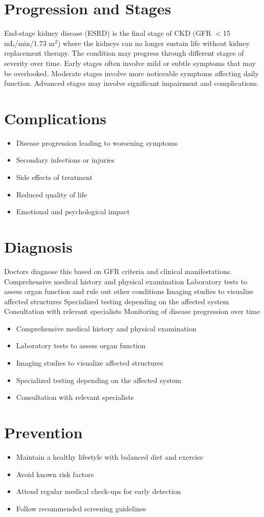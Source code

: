 \section{Progression and Stages}
End-stage kidney disease (ESRD) is the final stage of CKD (GFR $<$15 mL/min/1.73 m$^2$) where the kidneys can no longer sustain life without kidney replacement therapy. The condition may progress through different stages of severity over time. Early stages often involve mild or subtle symptoms that may be overlooked. Moderate stages involve more noticeable symptoms affecting daily function. Advanced stages may involve significant impairment and complications.
\section{Complications}
\begin{itemize}[noitemsep]
  \item Disease progression leading to worsening symptoms
  \item Secondary infections or injuries
  \item Side effects of treatment
  \item Reduced quality of life
  \item Emotional and psychological impact
\end{itemize}
\section{Diagnosis}
Doctors diagnose this based on GFR criteria and clinical manifestations. Comprehensive medical history and physical examination Laboratory tests to assess organ function and rule out other conditions Imaging studies to visualize affected structures Specialized testing depending on the affected system Consultation with relevant specialists Monitoring of disease progression over time

\begin{itemize}[noitemsep]
  \item Comprehensive medical history and physical examination
  \item Laboratory tests to assess organ function
  \item Imaging studies to visualize affected structures
  \item Specialized testing depending on the affected system
  \item Consultation with relevant specialists
\end{itemize}
\section{Prevention}
\begin{itemize}[noitemsep]
  \item Maintain a healthy lifestyle with balanced diet and exercise
  \item Avoid known risk factors
  \item Attend regular medical check-ups for early detection
  \item Follow recommended screening guidelines
\end{itemize}
